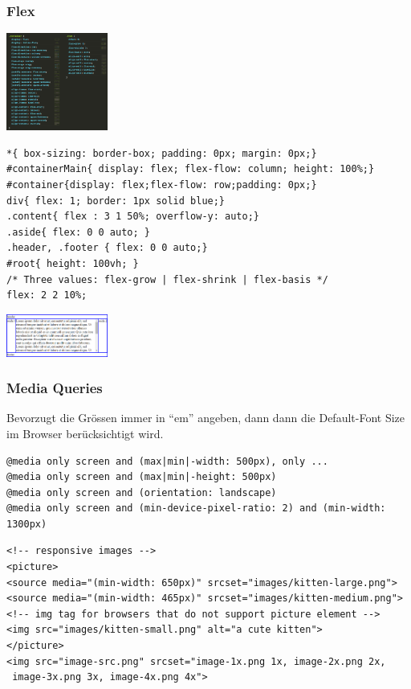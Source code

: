 \begin{multicols*}{4}
\subsubsection{Flex}
 \includegraphics[width=0.25\textwidth]{images/flexbox}
 \begin{verbatim}
*{ box-sizing: border-box; padding: 0px; margin: 0px;}
#containerMain{ display: flex; flex-flow: column; height: 100%;}
#container{display: flex;flex-flow: row;padding: 0px;}
div{ flex: 1; border: 1px solid blue;}
.content{ flex : 3 1 50%; overflow-y: auto;}
.aside{ flex: 0 0 auto; }
.header, .footer { flex: 0 0 auto;}
#root{ height: 100vh; }
/* Three values: flex-grow | flex-shrink | flex-basis */
flex: 2 2 10%;
\end{verbatim}
 \includegraphics[width=0.25\textwidth]{images/borderlayout}
\subsubsection{Media Queries}
Bevorzugt die Grössen immer in “em” angeben, 
dann dann die Default-Font Size im Browser berücksichtigt wird.
 \begin{verbatim}
@media only screen and (max|min|-width: 500px), only ...
@media only screen and (max|min|-height: 500px)
@media only screen and (orientation: landscape)
@media only screen and (min-device-pixel-ratio: 2) and (min-width: 1300px)
\end{verbatim}
 \begin{verbatim}
<!-- responsive images -->
<picture>
<source media="(min-width: 650px)" srcset="images/kitten-large.png">
<source media="(min-width: 465px)" srcset="images/kitten-medium.png">
<!-- img tag for browsers that do not support picture element -->
<img src="images/kitten-small.png" alt="a cute kitten">
</picture>
<img src="image-src.png" srcset="image-1x.png 1x, image-2x.png 2x,
 image-3x.png 3x, image-4x.png 4x">
\end{verbatim}


\end{multicols*}
